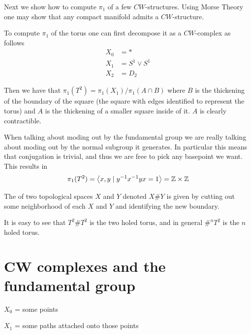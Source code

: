 \documentclass[11pt,leqno,oneside]{amsart}
\newenvironment{dateenv}{
  \vspace{1em}
}{
  \vspace{1em}
}
\newcommand{\mydate}[4]{
  \newdate{#1}{#2}{#3}{#4}
  \begin{dateenv}
    \hfill\displaydate{#1}
  \end{dateenv}
}
\numberwithin{thm}{section}
\begin{document}
Next we show how to compute \(\pi_1\) of a few
\(CW\)-structures. Using Morse Theory one may show that any compact
manifold admits a \(CW\)-structure.

To compute \(\pi_1\) of the torus one can first decompose it as a
\(CW\)-complex as follows
\begin{align*}
  X_0 &= *\\
  X_1 &= S^1 \vee S^1\\
  X_2 &= D_2
\end{align*}

Then we have that \(\pi_1(T^2) = \pi_1(X_1)/\pi_1(A \cap B)\) where
\(B\) is the thickening of the boundary of the square (the square with edges identified to represent the torus) and \(A\) is the thickening of a smaller square
inside of it. \(A\) is clearly contractible.

When talking about moding out by the fundamental group we are really
talking about moding out by the normal subgroup it generates. In
particular this means that conjugation is trivial, and thus we are
free to pick any basepoint we want. This results in
\[\pi_1(T^2) = \left\langle x,y \mid y^{-1}x^{-1}y x = 1 \right\rangle = {\mathbb Z}
    \times {\mathbb Z}\]

\begin{defn}
  The  of two topological spaces \(X\) and \(Y\)
  denoted \(X \# Y \) is given by cutting out some neighborhood of
  each \(X\) and \(Y\) and identifying the new boundary.
\end{defn}

It is easy to see that \(T^2 \# T^2\) is the two holed torus, and in general \(\#^n T^2\) is the \(n\) holed torus.

\mydate{e7}{8}{2}{2017}

\section{CW complexes and the fundamental group}

$X_0$ = some points

$X_1$ = some paths attached onto those points
\end{document}
